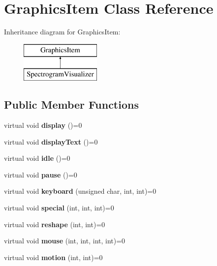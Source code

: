 \hypertarget{classGraphicsItem}{}\section{Graphics\+Item Class Reference}
\label{classGraphicsItem}
Inheritance diagram for Graphics\+Item\+:\begin{figure}[H]
\begin{center}
\leavevmode
\includegraphics[height=2.000000cm]{classGraphicsItem}
\end{center}
\end{figure}
\subsection*{Public Member Functions}
\begin{DoxyCompactItemize}
\item 
\mbox{\label{classGraphicsItem_a297b8c4f6ee3d69523af5593d73264d4}} 
virtual void {\bfseries display} ()=0
\item 
\mbox{\label{classGraphicsItem_ae452e1227c8a9ebcc44318a0966f38c9}} 
virtual void {\bfseries display\+Text} ()=0
\item 
\mbox{\label{classGraphicsItem_a91cd9e4283de204b004501482f5b6fc1}} 
virtual void {\bfseries idle} ()=0
\item 
\mbox{\label{classGraphicsItem_a01cc49913f553f0defe6817e124b3314}} 
virtual void {\bfseries pause} ()=0
\item 
\mbox{\label{classGraphicsItem_a8591c77fe00af4be64101d3533f1d9d7}} 
virtual void {\bfseries keyboard} (unsigned char, int, int)=0
\item 
\mbox{\label{classGraphicsItem_abd982a2447785360e944f7a92db27a14}} 
virtual void {\bfseries special} (int, int, int)=0
\item 
\mbox{\label{classGraphicsItem_a7c5b5fc7929ffad1514be846ae1737f1}} 
virtual void {\bfseries reshape} (int, int)=0
\item 
\mbox{\label{classGraphicsItem_ae55ed569dcaf7749ce160436626fb0c0}} 
virtual void {\bfseries mouse} (int, int, int, int)=0
\item 
\mbox{\label{classGraphicsItem_a6351546854c4b6e37d389b37da8fce2d}} 
virtual void {\bfseries motion} (int, int)=0
\end{DoxyCompactItemize}
